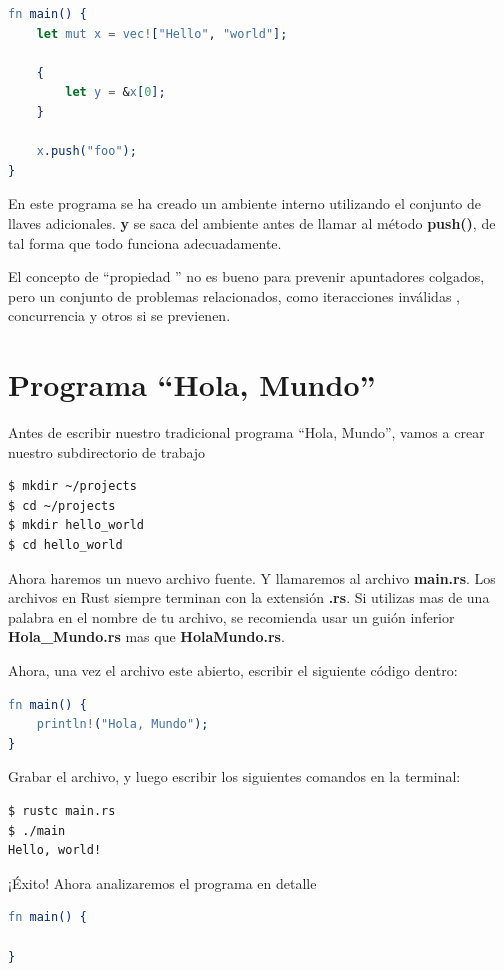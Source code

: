\documentclass[12pt, twoside]{report}
\begin{document}
\begin{lstlisting}[language=erlang]
fn main() {
	let mut x = vec!["Hello", "world"];
	
	{
		let y = &x[0];
	}
	
	x.push("foo");
}
\end{lstlisting}

En este programa se ha creado un ambiente interno utilizando el conjunto de llaves adicionales. \textbf{y} se saca del ambiente antes de llamar al método \textbf{push()}, de tal forma que todo funciona adecuadamente.

El concepto de ``propiedad '' no es bueno para prevenir apuntadores colgados, pero un conjunto de problemas relacionados, como iteracciones inválidas , concurrencia y otros si se previenen.



\section{Programa ``Hola, Mundo''}

Antes de escribir nuestro tradicional programa ``Hola, Mundo'', vamos a crear nuestro subdirectorio de trabajo

\begin{lstlisting}[language=bash]
$ mkdir ~/projects
$ cd ~/projects
$ mkdir hello_world
$ cd hello_world
\end{lstlisting}

Ahora haremos un nuevo archivo fuente. Y llamaremos al archivo \textbf{main.rs}. Los archivos en Rust siempre terminan con la extensión \textbf{.rs}. Si utilizas mas de una palabra en el nombre de tu archivo, se recomienda usar un guión inferior \textbf{Hola\_Mundo.rs} mas que \textbf{HolaMundo.rs}.

Ahora, una vez el archivo este abierto, escribir el siguiente código dentro:

\begin{lstlisting}[language=erlang]
fn main() {
	println!("Hola, Mundo");
}
\end{lstlisting}

Grabar el archivo, y luego escribir los siguientes comandos en la terminal:
\begin{lstlisting}[language=bash]
$ rustc main.rs
$ ./main 
Hello, world!
\end{lstlisting}

¡Éxito! Ahora analizaremos el programa en detalle

\begin{lstlisting}[language=erlang]
fn main() {

}
\end{lstlisting}
\end{document}
